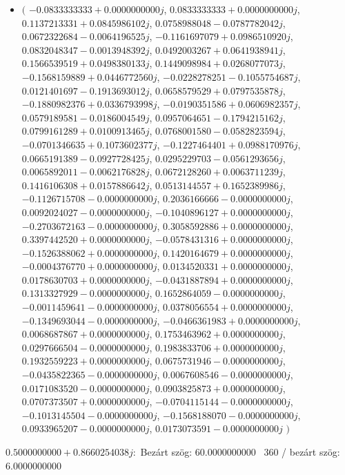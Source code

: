 \documentclass[14pt,a4paper]{article}
\begin{document}
\begin{itemize}
\item
$\big($
$-0.0833333333+0.0000000000j$, $0.0833333333+0.0000000000j$, $0.1137213331+0.0845986102j$, $0.0758988048-0.0787782042j$, $0.0672322684-0.0064196525j$, $-0.1161697079+0.0986510920j$, $0.0832048347-0.0013948392j$, $0.0492003267+0.0641938941j$, $0.1566539519+0.0498380133j$, $0.1449098984+0.0268077073j$, $-0.1568159889+0.0446772560j$, $-0.0228278251-0.1055754687j$, $0.0121401697-0.1913693012j$, $0.0658579529+0.0797535878j$, $-0.1880982376+0.0336793998j$, $-0.0190351586+0.0606982357j$, $0.0579189581-0.0186004549j$, $0.0957064651-0.1794215162j$, $0.0799161289+0.0100913465j$, $0.0768001580-0.0582823594j$, $-0.0701346635+0.1073602377j$, $-0.1227464401+0.0988170976j$, $0.0665191389-0.0927728425j$, $0.0295229703-0.0561293656j$, $0.0065892011-0.0062176828j$, $0.0672128260+0.0063711239j$, $0.1416106308+0.0157886642j$, $0.0513144557+0.1652389986j$, $-0.1126715708-0.0000000000j$, $0.2036166666-0.0000000000j$, $0.0092024027-0.0000000000j$, $-0.1040896127+0.0000000000j$, $-0.2703672163-0.0000000000j$, $0.3058592886+0.0000000000j$, $0.3397442520+0.0000000000j$, $-0.0578431316+0.0000000000j$, $-0.1526388062+0.0000000000j$, $0.1420164679+0.0000000000j$, $-0.0004376770+0.0000000000j$, $0.0134520331+0.0000000000j$, $0.0178630703+0.0000000000j$, $-0.0431887894+0.0000000000j$, $0.1313327929-0.0000000000j$, $0.1652864059-0.0000000000j$, $-0.0011459641-0.0000000000j$, $0.0378056554+0.0000000000j$, $-0.1349693044-0.0000000000j$, $-0.0466361983+0.0000000000j$, $0.0068687867+0.0000000000j$, $0.1753463962+0.0000000000j$, $0.0297666504-0.0000000000j$, $0.1983833706+0.0000000000j$, $0.1932559223+0.0000000000j$, $0.0675731946-0.0000000000j$, $-0.0435822365-0.0000000000j$, $0.0067608546-0.0000000000j$, $0.0171083520-0.0000000000j$, $0.0903825873+0.0000000000j$, $0.0707373507+0.0000000000j$, $-0.0704115144-0.0000000000j$, $-0.1013145504-0.0000000000j$, $-0.1568188070-0.0000000000j$, $0.0933965207-0.0000000000j$, $0.0173073591-0.0000000000j$
$\big)$
\end{itemize}
$0.5000000000+0.8660254038j$:\
Bezárt szög: $60.0000000000$ \
360 / bezárt szög: $6.0000000000$\
\end{document}
